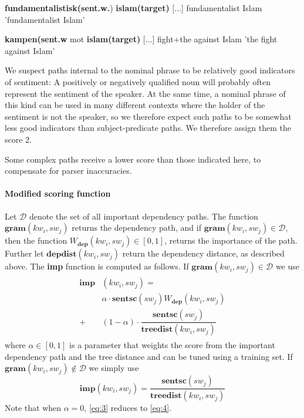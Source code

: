 \documentclass[11pt]{article}
\begin{document}
\begin{examples}
\item\label{adjatr}
\gll [...] \textbf{fundamentalistisk(sent.w.}) \textbf{islam(target)} [...]
{} fundamentalist Islam {}
\glt 'fundamentalist Islam'
\glend

\item\label{substatr}
\gll [...] \textbf{kampen(sent.w} mot \textbf{islam(target)} [...]
{} fight+the against Islam {}
\glt 'the fight against Islam'
\glend

\end{examples}

We suspect paths internal to the nominal phrase to be relatively good indicators of sentiment: A positively or negatively qualified noun will probably often represent the sentiment of the speaker. At the same time, a nominal phrase of this kind can be used in many different contexts where the holder of the sentiment is not the speaker, so we therefore expect such paths to be somewhat less good indicators than subject-predicate paths. We therefore assign them the score 2.

Some complex paths receive a lower score than those indicated here, to compensate for parser inaccuracies.

\paragraph{Modified scoring function}
Let $\mathcal{D}$ denote the set of all important dependency paths. The function $\mathbf{gram}(kw_i, sw_{j})$ returns the dependency path, and if $\mathbf{gram}(kw_i, sw_{j}) \in \mathcal{D}$, then the function $W_{\mathbf{dep}}(kw_i, sw_{j}) \in [0,1]$, returns the importance of the path. Further let $\mathbf{depdist}(kw_i, sw_{j})$ return the dependency distance, as described above. The \textbf{imp} function is computed as follows. If $\mathbf{gram}(kw_i, sw_{j}) \in \mathcal{D}$ we use
\begin{align}
  \begin{split}
    \label{eq:3}
  \mathbf{imp}&(kw_i, sw_{j}) = \\
  &\alpha \cdot \mathbf{sentsc}(sw_{j}) W_{\mathbf{dep}}(kw_i, sw_{j}) \\
  +&(1 - \alpha) \cdot \dfrac{\mathbf{sentsc}(sw_{j})}{\mathbf{treedist}(kw_i, sw_{j})}    
  \end{split}
\end{align}
where $\alpha \in [0,1]$ is a parameter that weights the score from the important dependency path and the tree distance and can be tuned using a training set. If $\mathbf{gram}(kw_i, sw_{j}) \not\in \mathcal{D}$ we simply use 
\begin{equation}
  \label{eq:4}
  \mathbf{imp}(kw_i, sw_{j}) = \dfrac{\mathbf{sentsc}(sw_{j})}{\mathbf{treedist}(kw_i, sw_{j})}    
\end{equation}
Note that when $\alpha = 0$, \eqref{eq:3} reduces to \eqref{eq:4}.
\end{document}

